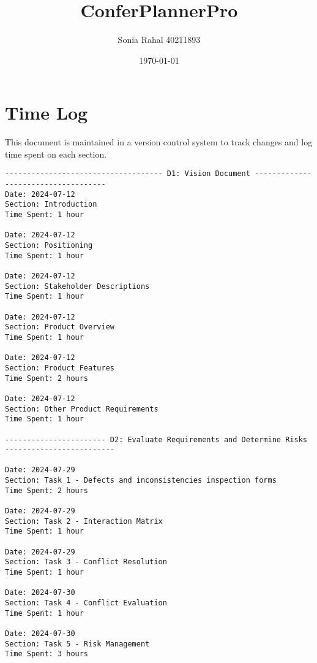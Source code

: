 \documentclass{article}
\begin{document}
\title{ConferPlannerPro}
\author{Sonia Rahal 40211893}
\date{\today}
\maketitle

\section{Time Log}
This document is maintained in a version control system to track changes and log time spent on each section.
\begin{verbatim}
------------------------------------ D1: Vision Document ------------------------------------
Date: 2024-07-12
Section: Introduction
Time Spent: 1 hour

Date: 2024-07-12
Section: Positioning
Time Spent: 1 hour

Date: 2024-07-12
Section: Stakeholder Descriptions
Time Spent: 1 hour

Date: 2024-07-12
Section: Product Overview
Time Spent: 1 hour

Date: 2024-07-12
Section: Product Features
Time Spent: 2 hours

Date: 2024-07-12
Section: Other Product Requirements
Time Spent: 1 hour

----------------------- D2: Evaluate Requirements and Determine Risks -------------------------

Date: 2024-07-29
Section: Task 1 - Defects and inconsistencies inspection forms
Time Spent: 2 hours

Date: 2024-07-29
Section: Task 2 - Interaction Matrix
Time Spent: 1 hour

Date: 2024-07-29
Section: Task 3 - Conflict Resolution
Time Spent: 1 hour

Date: 2024-07-30
Section: Task 4 - Conflict Evaluation
Time Spent: 1 hour

Date: 2024-07-30
Section: Task 5 - Risk Management
Time Spent: 3 hours



\end{verbatim}

\end{document}
